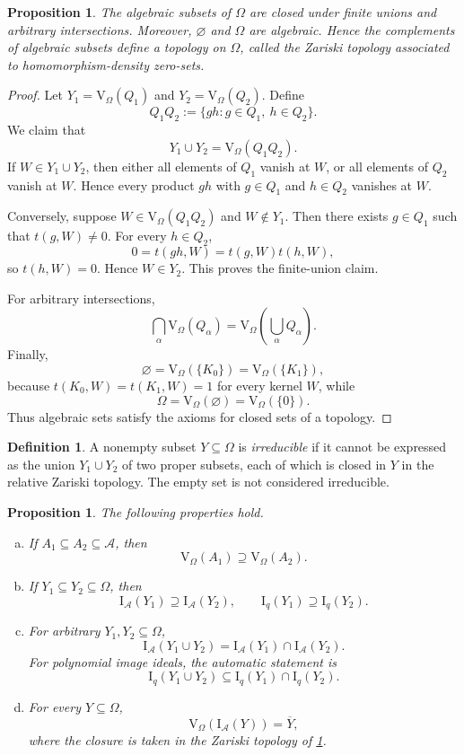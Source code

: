 \documentclass[a4paper,12pt]{article}
\newtheorem{proposition}[lemma]{Proposition}
\theoremstyle{definition}
\newtheorem{definition}[lemma]{Definition}
\newcommand\cA{\mathcal{A}}
\newcommand\V{\mathrm{V}_{\Omega}}
\newcommand\Iq{\mathrm{I}_{q}}
\newcommand\IA{\mathrm{I}_{\cA}}
\begin{document}
\begin{proposition}\label{proposition: zariski topology}
The algebraic subsets of $\Omega$ are closed under finite unions and arbitrary intersections. Moreover, $\varnothing$ and $\Omega$ are algebraic. Hence the complements of algebraic subsets define a topology on $\Omega$, called the Zariski topology associated to homomorphism-density zero-sets.
\end{proposition}

\begin{proof}
Let $Y_1=\V(Q_1)$ and $Y_2=\V(Q_2)$. Define
\[
    Q_1Q_2:=\{gh:g\in Q_1,\ h\in Q_2\}.
\]
We claim that
\[
    Y_1\cup Y_2=\V(Q_1Q_2).
\]
If $W\in Y_1\cup Y_2$, then either all elements of $Q_1$ vanish at $W$, or all elements of $Q_2$ vanish at $W$. Hence every product $gh$ with $g\in Q_1$ and $h\in Q_2$ vanishes at $W$.

Conversely, suppose $W\in\V(Q_1Q_2)$ and $W\notin Y_1$. Then there exists $g\in Q_1$ such that $t(g,W)\neq0$. For every $h\in Q_2$,
\[
    0=t(gh,W)=t(g,W)t(h,W),
\]
so $t(h,W)=0$. Hence $W\in Y_2$. This proves the finite-union claim.

For arbitrary intersections,
\[
    \bigcap_{\alpha}\V(Q_\alpha)=\V\!\left(\bigcup_{\alpha}Q_\alpha\right).
\]
Finally,
\[
    \varnothing=\V(\{K_0\})=\V(\{K_1\}),
\]
because $t(K_0,W)=t(K_1,W)=1$ for every kernel $W$, while
\[
    \Omega=\V(\varnothing)=\V(\{0\}).
\]
Thus algebraic sets satisfy the axioms for closed sets of a topology.
\end{proof}

\begin{definition}\label{definition: irreducible}
A nonempty subset $Y\subseteq\Omega$ is \textit{irreducible} if it cannot be expressed as the union $Y_1\cup Y_2$ of two proper subsets, each of which is closed in $Y$ in the relative Zariski topology. The empty set is not considered irreducible.
\end{definition}

\begin{proposition}\label{proposition: ideal variety properties}
The following properties hold.
\begin{enumerate}[(a)]
    \item If $A_1\subseteq A_2\subseteq\cA$, then
    \[
        \V(A_1)\supseteq\V(A_2).
    \]
    \item If $Y_1\subseteq Y_2\subseteq\Omega$, then
    \[
        \IA(Y_1)\supseteq\IA(Y_2),\qquad \Iq(Y_1)\supseteq\Iq(Y_2).
    \]
    \item For arbitrary $Y_1,Y_2\subseteq\Omega$,
    \[
        \IA(Y_1\cup Y_2)=\IA(Y_1)\cap\IA(Y_2).
    \]
    For polynomial image ideals, the automatic statement is
    \[
        \Iq(Y_1\cup Y_2)\subseteq\Iq(Y_1)\cap\Iq(Y_2).
    \]
    \item For every $Y\subseteq\Omega$,
    \[
        \V(\IA(Y))=\overline{Y},
    \]
    where the closure is taken in the Zariski topology of \cref{proposition: zariski topology}.
\end{enumerate}
\end{proposition}
\end{document}
